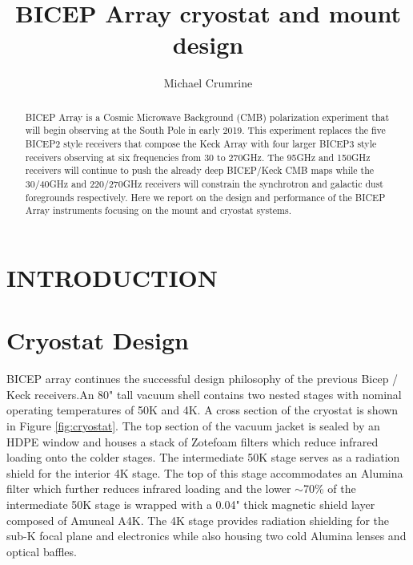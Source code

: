 \documentclass[]{spie}  %
\title{BICEP Array cryostat and mount design}
\author[a]{Michael Crumrine}
\author[b]{}
\affil[a]{School of Physics and Astronomy, University of Minnesota,
Minneapolis, MN 55455, USA}
\affil[b]{Affiliation2, Address, City, Country}
\begin{document}
 
\maketitle

\begin{abstract}

BICEP Array is a Cosmic Microwave Background (CMB) polarization experiment that
will begin observing at the South Pole in early 2019. This experiment replaces
the five BICEP2 style receivers that compose the Keck Array with four larger
BICEP3 style receivers observing at six frequencies from 30 to 270GHz. The
95GHz and 150GHz receivers will continue to push the already deep BICEP/Keck
CMB maps while the 30/40GHz and 220/270GHz receivers will constrain the
synchrotron and galactic dust foregrounds respectively. Here we report on the
design  and performance of the BICEP Array instruments focusing on the mount
and cryostat systems.
\end{abstract}


\section{INTRODUCTION}
\label{sec:intro}  %








\section{Cryostat Design}

BICEP array continues the successful design philosophy of
the previous Bicep / Keck receivers.An 80" tall vacuum shell contains two nested
stages with nominal operating temperatures of 50K and 4K. A cross section of
the cryostat is shown in Figure \ref{fig:cryostat}. The top section of the
vacuum jacket is sealed by an HDPE window and houses a stack of Zotefoam filters which reduce infrared loading
onto the colder stages. The intermediate 50K stage serves as a radiation
shield for the interior 4K stage. The top of this stage accommodates an
Alumina filter which further reduces infrared loading and the lower $\sim$70\%
of the intermediate 50K stage is wrapped with a 0.04" thick magnetic shield
layer composed of Amuneal A4K. The 4K stage provides radiation shielding for
the sub-K focal plane and electronics while also housing two cold Alumina
lenses and optical baffles.
\end{document}
